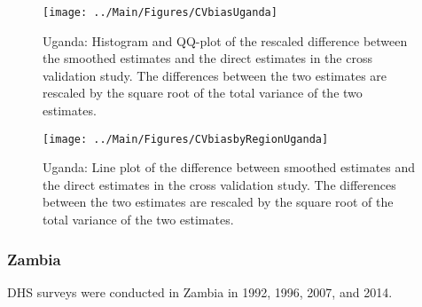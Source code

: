\documentclass[12pt]{article}\usepackage[]{graphicx}\usepackage[]{color}
\newenvironment{knitrout}{}{} %
\begin{document}
\begin{knitrout}
\color{fgcolor}\begin{figure}[bht]

{\centering \texttt{[image: ../Main/Figures/CVbiasUganda]} 

}

\caption[Uganda]{Uganda: Histogram and QQ-plot of the rescaled difference between the smoothed estimates and the direct estimates in the cross validation study. The differences between the two estimates are rescaled by the square root of the total variance of the two estimates.}\label{fig:unnamed-chunk-329}
\end{figure}


\end{knitrout}

\begin{knitrout}
\color{fgcolor}\begin{figure}[bht]

{\centering \texttt{[image: ../Main/Figures/CVbiasbyRegionUganda]} 

}

\caption[Uganda]{Uganda: Line plot of the difference between smoothed estimates and the direct estimates in the cross validation study. The differences between the two estimates are rescaled by the square root of the total variance of the two estimates.}\label{fig:unnamed-chunk-330}
\end{figure}


\end{knitrout}



\clearpage
\subsubsection{Zambia}





DHS surveys were conducted in Zambia in 1992, 1996, 2007, and 2014.
\end{document}
